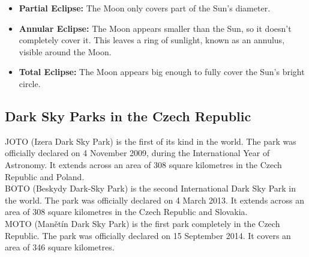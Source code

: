 \documentclass{article}
\begin{document}
\begin{itemize}
    \item \textbf{Partial Eclipse:} The Moon only covers part of the Sun's diameter\cite{timeanddate_eclipse_magnitude}.
    \item \textbf{Annular Eclipse:} The Moon appears smaller than the Sun, so it doesn't completely cover it. This leaves a ring of sunlight, known as an annulus, visible around the Moon\cite{timeanddate_eclipse_magnitude}.
    \item \textbf{Total Eclipse:} The Moon appears big enough to fully cover the Sun's bright circle\cite{timeanddate_eclipse_magnitude}.
\end{itemize}

\subsection*{Dark Sky Parks in the Czech Republic}

JOTO (Izera Dark Sky Park) is the first of its kind in the world. The park was officially declared on 4 November 2009, during the International Year of Astronomy. It extends across an area of 308 square kilometres in the Czech Republic and Poland\cite{astrocz_oblasti_tmave_oblohy}.\\
BOTO (Beskydy Dark-Sky Park) is the second International Dark Sky Park in the world. The park was officially declared on 4 March 2013. It extends across an area of 308 square kilometres in the Czech Republic and Slovakia\cite{astrocz_oblasti_tmave_oblohy}.\\
MOTO (Manětín Dark Sky Park) is the first park completely in the Czech Republic. The park was officially declared on 15 September 2014. It covers an area of 346 square kilometres\cite{astrocz_oblasti_tmave_oblohy}.
\end{document}

